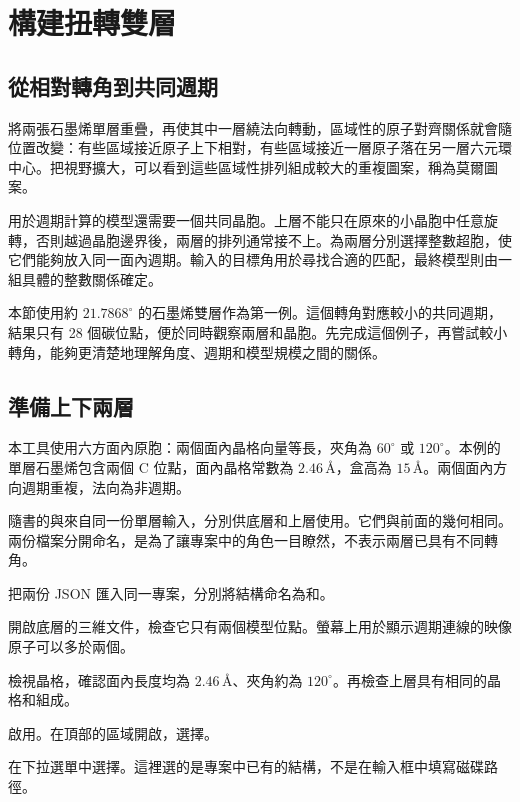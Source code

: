 \section{構建扭轉雙層}\label{sec:twisted-structures}

\subsection{從相對轉角到共同週期}

將兩張石墨烯單層重疊，再使其中一層繞法向轉動，區域性的原子對齊關係就會隨位置改變：有些區域接近原子上下相對，有些區域接近一層原子落在另一層六元環中心。把視野擴大，可以看到這些區域性排列組成較大的重複圖案，稱為莫爾圖案。

用於週期計算的模型還需要一個共同晶胞。上層不能只在原來的小晶胞中任意旋轉，否則越過晶胞邊界後，兩層的排列通常接不上。為兩層分別選擇整數超胞，使它們能夠放入同一面內週期。輸入的目標角用於尋找合適的匹配，最終模型則由一組具體的整數關係確定。

本節使用約 $21.7868^\circ$ 的石墨烯雙層作為第一例。這個轉角對應較小的共同週期，結果只有 28 個碳位點，便於同時觀察兩層和晶胞。先完成這個例子，再嘗試較小轉角，能夠更清楚地理解角度、週期和模型規模之間的關係。

\subsection{準備上下兩層}

本工具使用六方面內原胞：兩個面內晶格向量等長，夾角為 $60^\circ$ 或 $120^\circ$。本例的單層石墨烯包含兩個 C 位點，面內晶格常數為 $2.46\,\text{\AA}$，盒高為 $15\,\text{\AA}$。兩個面內方向週期重複，法向為非週期。

隨書的與來自同一份單層輸入，分別供底層和上層使用。它們與前面的幾何相同。兩份檔案分開命名，是為了讓專案中的角色一目瞭然，不表示兩層已具有不同轉角。

\begin{steps}
  \item 把兩份 JSON 匯入同一專案，分別將結構命名為和。
  \item 開啟底層的三維文件，檢查它只有兩個模型位點。螢幕上用於顯示週期連線的映像原子可以多於兩個。
  \item 檢視晶格，確認面內長度均為 $2.46\,\text{\AA}$、夾角約為 $120^\circ$。再檢查上層具有相同的晶格和組成。
  \item 啟用。在頂部的區域開啟，選擇。
  \item 在下拉選單中選擇。這裡選的是專案中已有的結構，不是在輸入框中填寫磁碟路徑。
\end{steps}

